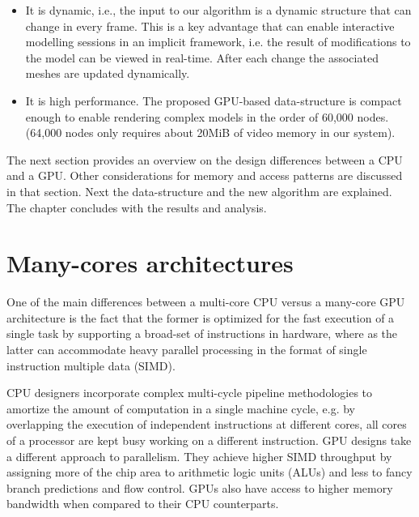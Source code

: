 \begin{itemize}
 \item It is dynamic, i.e., the input to our algorithm is a dynamic \blob structure that can change 
 in every frame. This is a key advantage that can enable interactive modelling sessions in an implicit 
 framework, i.e. the result of modifications to the model can be viewed in real-time. 
 After each change the associated meshes are updated dynamically. 

 \item It is high performance. The proposed GPU-based data-structure is compact enough to enable 
 rendering complex \blob models in the order of 60,000 nodes. (64,000 nodes only requires about 
 20MiB of video memory in our system).
\end{itemize}


The next section provides an overview on the design differences between a CPU and 
a GPU. Other considerations for memory and access patterns are discussed in that section.  
Next the data-structure and the new algorithm are explained. The chapter concludes with the results 
and analysis.

\section{Many-cores architectures}
One of the main differences between a multi-core CPU versus a many-core GPU 
architecture is the fact that the former is optimized for the fast execution of 
a single task by supporting a broad-set of instructions in hardware, where as the latter can accommodate 
heavy parallel processing in the format of single instruction multiple data (SIMD). 

CPU designers incorporate complex multi-cycle pipeline methodologies to amortize 
the amount of computation in a single machine cycle, e.g. by overlapping the execution of independent 
instructions at different cores, all cores of a processor are kept busy working on a different instruction. 
GPU designs take a different approach to parallelism. They achieve higher SIMD throughput by assigning 
more of the chip area to arithmetic logic units (ALUs) and less to fancy branch predictions and flow control. 
GPUs also have access to higher memory bandwidth when compared to their CPU counterparts.


